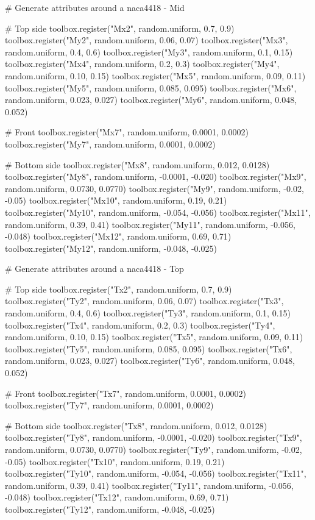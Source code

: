 \begin{pythoncode}
# Generate attributes around a naca4418 - Mid

# Top side
toolbox.register("Mx2", random.uniform, 0.7, 0.9)
toolbox.register("My2", random.uniform, 0.06, 0.07)
toolbox.register("Mx3", random.uniform, 0.4, 0.6)
toolbox.register("My3", random.uniform, 0.1, 0.15)
toolbox.register("Mx4", random.uniform, 0.2, 0.3)
toolbox.register("My4", random.uniform, 0.10, 0.15)
toolbox.register("Mx5", random.uniform, 0.09, 0.11)
toolbox.register("My5", random.uniform, 0.085, 0.095)
toolbox.register("Mx6", random.uniform, 0.023, 0.027) 
toolbox.register("My6", random.uniform, 0.048, 0.052)

# Front
toolbox.register("Mx7", random.uniform, 0.0001, 0.0002) 
toolbox.register("My7", random.uniform, 0.0001, 0.0002)

# Bottom side
toolbox.register("Mx8", random.uniform, 0.012, 0.0128) 
toolbox.register("My8", random.uniform, -0.0001, -0.020)
toolbox.register("Mx9", random.uniform, 0.0730, 0.0770) 
toolbox.register("My9", random.uniform, -0.02, -0.05)
toolbox.register("Mx10", random.uniform, 0.19, 0.21) 
toolbox.register("My10", random.uniform, -0.054, -0.056)
toolbox.register("Mx11", random.uniform, 0.39, 0.41) 
toolbox.register("My11", random.uniform, -0.056, -0.048)
toolbox.register("Mx12", random.uniform, 0.69, 0.71) 
toolbox.register("My12", random.uniform, -0.048, -0.025)

# Generate attributes around a naca4418 - Top

# Top side
toolbox.register("Tx2", random.uniform, 0.7, 0.9)
toolbox.register("Ty2", random.uniform, 0.06, 0.07)
toolbox.register("Tx3", random.uniform, 0.4, 0.6)
toolbox.register("Ty3", random.uniform, 0.1, 0.15)
toolbox.register("Tx4", random.uniform, 0.2, 0.3)
toolbox.register("Ty4", random.uniform, 0.10, 0.15)
toolbox.register("Tx5", random.uniform, 0.09, 0.11)
toolbox.register("Ty5", random.uniform, 0.085, 0.095)
toolbox.register("Tx6", random.uniform, 0.023, 0.027) 
toolbox.register("Ty6", random.uniform, 0.048, 0.052)

# Front
toolbox.register("Tx7", random.uniform, 0.0001, 0.0002) 
toolbox.register("Ty7", random.uniform, 0.0001, 0.0002)

# Bottom side
toolbox.register("Tx8", random.uniform, 0.012, 0.0128) 
toolbox.register("Ty8", random.uniform, -0.0001, -0.020)
toolbox.register("Tx9", random.uniform, 0.0730, 0.0770) 
toolbox.register("Ty9", random.uniform, -0.02, -0.05)
toolbox.register("Tx10", random.uniform, 0.19, 0.21) 
toolbox.register("Ty10", random.uniform, -0.054, -0.056)
toolbox.register("Tx11", random.uniform, 0.39, 0.41) 
toolbox.register("Ty11", random.uniform, -0.056, -0.048)
toolbox.register("Tx12", random.uniform, 0.69, 0.71) 
toolbox.register("Ty12", random.uniform, -0.048, -0.025)


\end{pythoncode}
